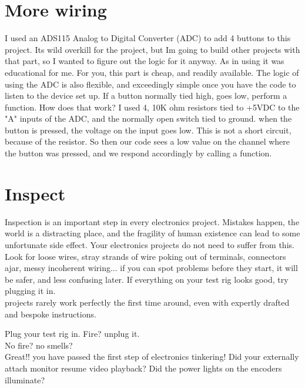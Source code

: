\documentclass[]{article}
\begin{document}

\section*{More wiring} I used an ADS115 Analog to Digital Converter (ADC) to add 4 buttons to this project. Its wild overkill for the project, but Im going to build other projects with that part, so I wanted to figure out the logic for it anyway.
As in using it was educational for me. For you, this part is cheap, and readily available. The logic of using the ADC is also flexible, and exceedingly simple once you have the code to listen to the device set up. If a button normally tied high, goes low, perform a function. 
How does that work? I used 4, 10K ohm resistors tied to +5VDC to the "A" inputs of the ADC, and the normally open switch tied to ground. when the button is pressed, the voltage on the input goes low. This is not a short circuit, because of the resistor. So then our code sees a low value on the channel where the button was pressed, and we respond accordingly by calling a function.  



\section*{Inspect}
Inspection is an important step in every electronics project. Mistakes happen, the world is a distracting place, and the fragility of human existence can lead to some unfortunate side effect. Your electronics projects do not need to suffer from this. Look for loose wires, stray strands of wire poking out of terminals, connectors ajar,  messy incoherent wiring... if you can spot problems before they start, it will be safer, and less confusing later. If everything on your test rig looks good, try plugging it in.\\ projects rarely work perfectly the first time around, even with expertly drafted and bespoke instructions. 

Plug your test rig in. Fire? unplug it.\\No fire? no smells? \\ Great!! you have passed the first step of electronics tinkering!
Did your externally attach monitor resume video playback? Did the power lights on the encoders illuminate?
\end{document}
